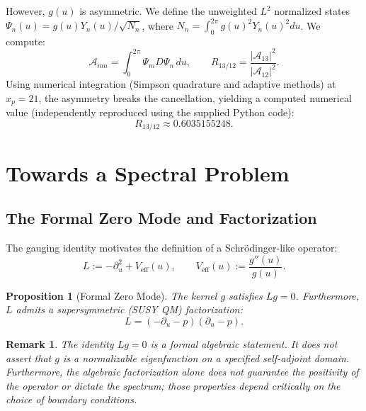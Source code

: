 \documentclass[11pt,a4paper]{article}
\newtheorem{proposition}{Proposition}
\newtheorem{remark}{Remark}
\begin{document}
However, \(g(u)\) is asymmetric. We define the unweighted \(L^2\) normalized states \(\Psi_n(u) = g(u)Y_n(u)/\sqrt{N_n}\), where \(N_n = \int_0^{2\pi} g(u)^2 Y_n(u)^2 du\). We compute:
\begin{equation}
\mathcal{A}_{mn} = \int_0^{2\pi} \Psi_m D \Psi_n \, du, \qquad R_{13/12} = \frac{|\mathcal{A}_{13}|^2}{|\mathcal{A}_{12}|^2}.
\end{equation}
Using numerical integration (Simpson quadrature and adaptive methods) at \(x_p=21\), the asymmetry breaks the cancellation, yielding a computed numerical value (independently reproduced using the supplied Python code):
\begin{equation}
R_{13/12} \approx 0.6035155248.
\end{equation}

\section{Towards a Spectral Problem}
\label{sec:spectral}

\subsection{The Formal Zero Mode and Factorization}
The gauging identity motivates the definition of a Schr\"odinger-like operator:
\begin{equation}
L := -\partial_u^2 + V_{\text{eff}}(u), \qquad V_{\text{eff}}(u) := \frac{g''(u)}{g(u)}.
\end{equation}
\begin{proposition}[Formal Zero Mode]
The kernel \(g\) satisfies \(Lg = 0\). Furthermore, \(L\) admits a supersymmetric (SUSY QM) factorization:
\begin{equation}
L = (-\partial_u - p)(\partial_u - p).
\end{equation}
\end{proposition}

\begin{remark}
The identity \(Lg=0\) is a formal algebraic statement. It does not assert that \(g\) is a normalizable eigenfunction on a specified self-adjoint domain. Furthermore, the algebraic factorization alone does not guarantee the positivity of the operator or dictate the spectrum; those properties depend critically on the choice of boundary conditions.
\end{remark}
\end{document}
